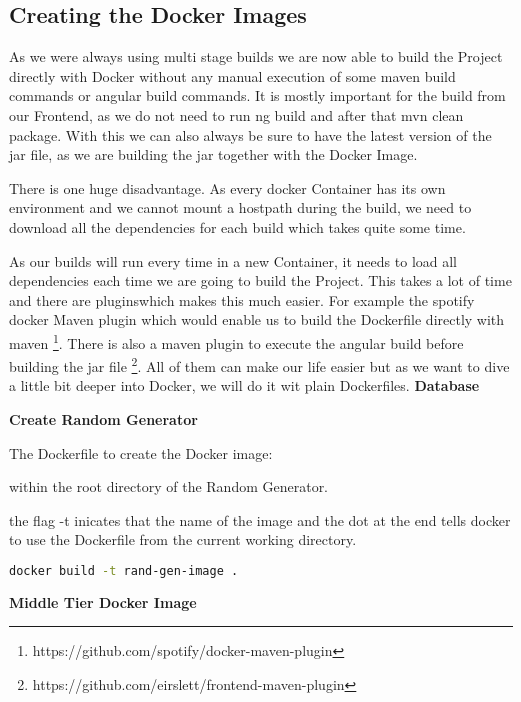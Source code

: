 \subsection{Creating the Docker Images}
As we were always using multi stage builds we are now able to build the Project directly with Docker without any manual execution of some maven build commands or angular build commands.
It is mostly important for the build from our Frontend, as we do not need to run ng build and after that mvn clean package.
With this we can also always be sure to have the latest version of the jar file, as we are building the jar together with the Docker Image.

There is one huge disadvantage. As every docker Container has its own environment and we cannot mount a hostpath during the build, we need to download all the dependencies for each build which takes quite some time.

As our builds will run every time in a new Container, it needs to load all dependencies each time we are going to build the Project. This takes a lot of time and there are pluginswhich makes this much easier.
For example the spotify docker Maven plugin which would enable us to build the Dockerfile directly with maven \footnote{https://github.com/spotify/docker-maven-plugin}.
There is also a maven plugin to execute the angular build before building the jar file \footnote{https://github.com/eirslett/frontend-maven-plugin}.
All of them can make our life easier but as we want to dive a little bit deeper into Docker, we will do it wit plain Dockerfiles.
\textbf{Database}



\textbf{Create Random Generator}

The Dockerfile to create the Docker image:


within the root directory of the Random Generator.

the flag -t inicates that the name of the image and the dot at the end tells docker to use the Dockerfile from the current working directory.

\begin{lstlisting}[language=Bash]
docker build -t rand-gen-image .
\end{lstlisting}

\textbf{Middle Tier Docker Image}


